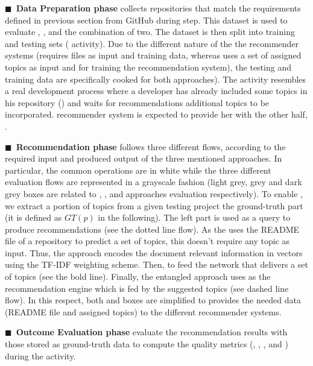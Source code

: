 \noindent
$\blacksquare$~\textbf{Data Preparation phase} collects repositories that match the requirements defined in previous section from GitHub during  step. This dataset is used to evaluate \CT, \MNB, and the combination of two. 
The dataset is then split into training and testing sets (\ie {} activity).
Due to the different nature of the the recommender systems (\ie \MNB requires  files as input and training data, whereas \CT uses a set of assigned topics as input and for training the recommendation system), the testing and training data are specifically cooked for both approaches).
The  activity resembles a real development process where a developer has already included some topics in his repository (\ie {}) and waits for recommendations \ie additional topics to be incorporated. \CT recommender system is expected to provide her with the other half, \ie {}.

\noindent
$\blacksquare$~\textbf{Recommendation phase} follows three different flows, according to the required input and produced output of the three mentioned approaches. In particular, the common operations are in white while the three different evaluation flows are represented in a grayscale fashion (\ie light grey, grey and dark grey boxes are related to \code{\CT}, \code{\MNB}, and  approaches evaluation respectively).
To enable \CT, we extract a portion of topics from a given testing project \ie the ground-truth part (it is defined as $GT(p)$ in the following). The left part is used as a query to produce recommendations (see the dotted line flow). As the \MNB uses the README file of a repository to predict a set of topics, this doesn't require any topic as input. Thus, the approach encodes the document relevant information in vectors using the TF-IDF weighting scheme. Then, to feed the network that delivers a set of topics (see the bold line). Finally, the entangled approach uses \CT as the recommendation engine which is fed by the \MNB suggested topics (see dashed line flow). In this respect, both  and  boxes are simplified to provides the needed data (\ie README file and assigned topics) to the different recommender systems.

\noindent
$\blacksquare$~\textbf{Outcome Evaluation phase} evaluate the recommendation results with those stored as ground-truth data to compute the quality metrics (\ie {}, , , and ) during the  activity.  

